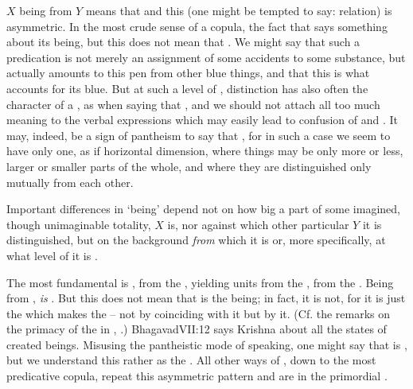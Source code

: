 $X$ being  from $Y$ means that  and this (one
might be tempted to say: relation) is asymmetric. In the most crude sense of a
copula, the fact that  says something about its being, but
this does not mean that .
We might say that such a predication is not merely an assignment of some
accidents to some substance, but actually amounts to  this
pen from other blue things, and that this is what accounts for its 
blue.  But at such a level of , distinction has also often the
character of a , as when saying that , and we should not attach all too much meaning to the verbal
expressions which may easily lead to confusion of  and . It may, indeed, be a sign of pantheism to say that , for in such a case we seem to have only one, as if
horizontal dimension, where things may be only more or less, larger or smaller
parts of the whole, and where they are distinguished only mutually from each other.

\pa Important differences in `being' depend not on how big a part of some
imagined, though unimaginable totality, $X$ is, nor against which other
particular $Y$ it is distinguished, but on the background {\em from} which it is
 or, more specifically, at what level of
 it is . 

The most fundamental  is ,  from the
, yielding units from the ,  from the .
Being  from ,  {\em is} . 
But this does not mean that  is the  being; in fact, it is
not, for it is just the  which makes the 
 -- not by coinciding with it but by  it. (Cf. the
remarks on the primacy of the  in ,
.)  \citet{I am not in them; they are in
  Me.}{Bhagavad}{VII:12} says Krishna about all the states of created beings.
Misusing the pantheistic mode of speaking, one might say that  is
 , but we understand this  rather as
the .  All other ways of , down to the
most  predicative copula, repeat this asymmetric pattern and are
 in the primordial . 

